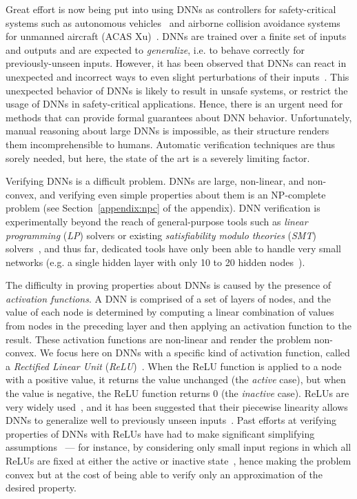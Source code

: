 \documentclass[a4paper]{llncs}
\begin{document}
Great effort is now being put into
using DNNs as controllers for safety-critical systems such as autonomous
vehicles~\cite{BoDeDwFiFlGoJaMoMuZhZhZhZi16} and
airborne collision avoidance systems for unmanned aircraft
(ACAS Xu)~\cite{JuLoBrOwKo16}. 
DNNs are trained over a finite set of inputs and outputs and are
expected to \emph{generalize}, i.e. to behave correctly for previously-unseen inputs.
However, it has been observed that DNNs can react in unexpected and incorrect
ways to even slight perturbations of their
inputs~\cite{SzZaSuBrErGoFe13}. 
This unexpected behavior of DNNs is likely to result in unsafe
systems, or restrict the usage of DNNs in safety-critical applications.
Hence, there is an urgent need for methods that can provide formal 
 guarantees about DNN behavior. 
Unfortunately, manual reasoning about large DNNs is impossible, as 
their structure renders them incomprehensible to humans. Automatic
verification techniques are thus sorely needed, 
but here, the state of the art is a 
severely limiting factor. 

Verifying DNNs is a difficult problem. DNNs are large, non-linear, and
non-convex, and verifying even simple properties about them is
an NP-complete problem (see Section~\ref*{appendix:npc} of the
appendix). DNN verification is experimentally beyond the reach of
general-purpose tools such as \emph{linear programming} (\emph{LP})
solvers or
existing \emph{satisfiability modulo theories} (\emph{SMT})
solvers~\cite{PuTa12,BaIoLaVyNoCr16,HuKwWaWu16}, and thus far, dedicated tools
have only been able to handle very small networks (e.g. a single hidden layer
with only 10 to 20 hidden nodes~\cite{PuTa10, PuTa12}).
 
The difficulty in proving properties about DNNs is caused by the
presence of \emph{activation functions}. A DNN is comprised
of a set of layers of nodes, and the value of each node is
determined by computing a linear combination of values from nodes in the
preceding layer and then applying an activation function to the
result.
These activation functions are non-linear and render the
problem non-convex.
We focus here on DNNs with a specific kind of activation
function, called a \emph{Rectified Linear Unit} (\emph{ReLU})~\cite{NaHi10}. When
the ReLU function is applied to a node with a  
positive value, it returns the value unchanged (the \emph{active} case), but when the value is negative,
the ReLU function returns $0$ (the \emph{inactive} case).
 ReLUs are very widely used~\cite{KrSuHi12,MaHaNg13}, and it has been suggested that  their
 piecewise linearity allows DNNs to 
generalize well to previously unseen inputs~\cite{FoBeCu16, GlBoBe11,
  NaHi10, JaKaLe09}.
Past efforts at verifying properties of DNNs with ReLUs have
had to make significant simplifying assumptions~\cite{HuKwWaWu16, BaIoLaVyNoCr16} ---
for instance, by considering only small input regions in which all ReLUs are
fixed at either the active or inactive state~\cite{BaIoLaVyNoCr16}, hence making the problem
convex but at the cost of being able to verify only an approximation of the
desired property.
\end{document}
